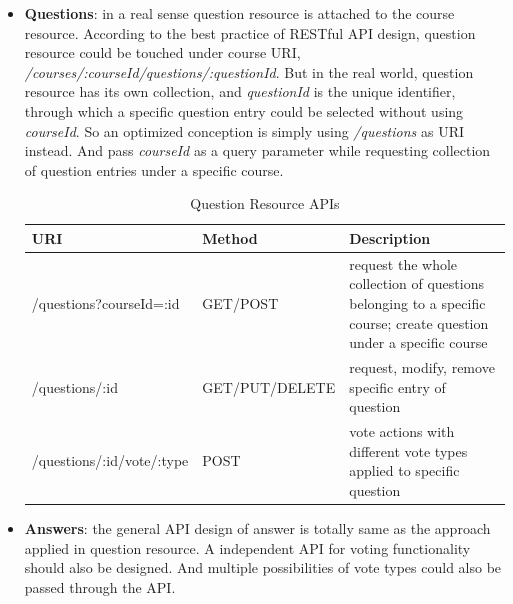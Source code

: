 \begin{itemize}
\item
\textbf{Questions}: in a real sense question resource is attached to the course resource. According to the best practice of RESTful API design\cite{bestPracticeRest}, question resource could be touched under course URI, \textit{/courses/:courseId/questions/:questionId}. But in the real world, question resource has its own collection, and \textit{questionId} is the unique identifier, through which a specific question entry could be selected without using  
\textit{courseId}. So an optimized conception is simply using \textit{/questions} as URI instead. And pass \textit{courseId} as a query parameter while requesting collection of question entries under a specific course. 
\begin{table}[!htbp]
\centering

\begin{tabularx}{\textwidth}{@{}llX@{}}
\toprule
URI                                   & Method         & Description                                                                                                                                                 \\ \midrule
/questions?courseId=:id               & GET/POST       & request the whole collection of questions belonging to a specific course; create question under a specific course \\
/questions/:id                & GET/PUT/DELETE & request, modify, remove specific entry of question                                                                                                          \\
/questions/:id/vote/:type      & POST          & vote actions with different vote types applied to specific question  \\ \bottomrule
\end{tabularx}
\caption{Question Resource APIs}
\label{table:question-resource-apis}
\end{table}


\item
\textbf{Answers}: the general API design of answer is totally same as the approach applied in question resource. A independent API for voting functionality should also be designed. And multiple possibilities of vote types could also be passed through the API.

\begin{table}[!htbp]
\centering


\end{table}
\end{itemize}
